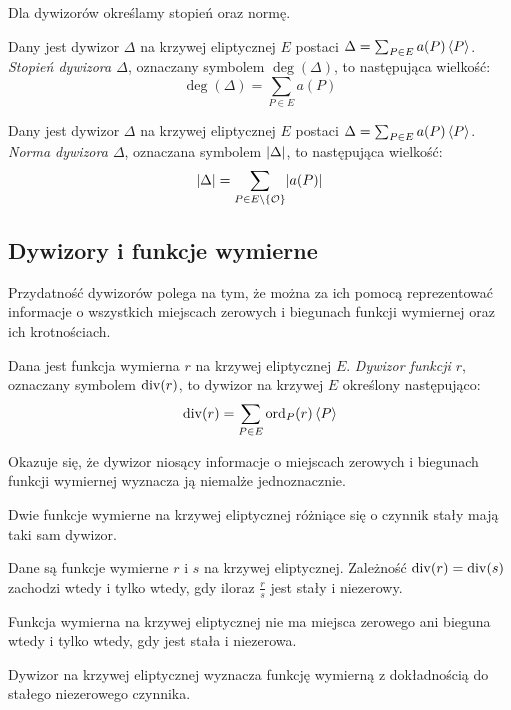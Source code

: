 Dla dywizorów określamy stopień oraz normę.

\begin{definition}
Dany jest dywizor $\Delta$ na krzywej eliptycznej $E$
postaci $\Delta = \sum_{P \in E} a(P)\left\langle P\right\rangle$.
\emph{Stopień dywizora $\Delta$},
oznaczany symbolem $\deg(\Delta)$,
to następująca wielkość:
\begin{equation*}
\deg(\Delta) = \sum_{P \in E} a(P)
\end{equation*}
\end{definition}

\begin{definition}
Dany jest dywizor $\Delta$ na krzywej eliptycznej $E$
postaci $\Delta = \sum_{P \in E} a(P)\left\langle P\right\rangle$.
\emph{Norma dywizora $\Delta$},
oznaczana symbolem $\lvert\Delta\rvert$,
to następująca wielkość:
\begin{equation*}
\lvert\Delta\rvert = \sum_{P \in E \setminus \{\mathcal{O}\}} \lvert a(P)\rvert
\end{equation*}
\end{definition}

\subsection*{Dywizory i funkcje wymierne}

Przydatność dywizorów polega na tym, że można za ich pomocą
reprezentować informacje
o wszystkich miejscach zerowych i biegunach funkcji wymiernej
oraz ich krotnościach.

\begin{definition}
Dana jest funkcja wymierna $r$ na krzywej eliptycznej $E$.
\emph{Dywizor funkcji $r$},
oznaczany symbolem $\operatorname{div}(r)$,
to dywizor na krzywej $E$ określony następująco:
\begin{equation*}
\operatorname{div}(r) = \sum_{P \in E} \operatorname{ord}_P(r)\left\langle P\right\rangle
\end{equation*}
\end{definition}

Okazuje się, że dywizor niosący informacje o miejscach zerowych i biegunach
funkcji wymiernej wyznacza ją niemalże jednoznacznie.

\begin{fact}
Dwie funkcje wymierne na krzywej eliptycznej
różniące się o czynnik stały mają taki sam dywizor.
\end{fact}

\begin{theorem}
Dane są funkcje wymierne $r$ i $s$ na krzywej eliptycznej.
Zależność $\operatorname{div}(r) = \operatorname{div}(s)$ zachodzi wtedy i tylko wtedy,
gdy iloraz $\frac{r}{s}$ jest stały i niezerowy.
\end{theorem}

\begin{corollary}\label{zero_div_const_fun_coro}
Funkcja wymierna na krzywej eliptycznej
nie ma miejsca zerowego ani bieguna wtedy i tylko wtedy,
gdy jest stała i niezerowa.
\end{corollary}

\begin{corollary}\label{fun_divi_equiv_to_const_lemma}
Dywizor na krzywej eliptycznej
wyznacza funkcję wymierną z dokładnością do stałego niezerowego czynnika.
\end{corollary}
